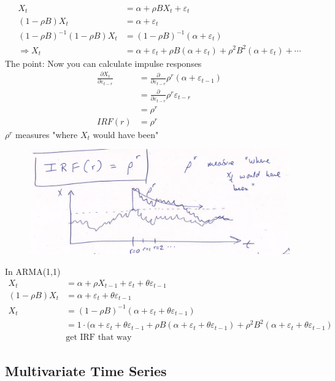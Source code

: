 \begin{align*}
    X_t &= \alpha+ \rho B X_t + \varepsilon_t\\
    (1-\rho B) X_t &= \alpha + \varepsilon_t \\
    (1-\rho B)^{-1}(1-\rho B) X_t &= (1-\rho B)^{-1} (\alpha + \varepsilon_t)\\
    \Rightarrow X_t &= \alpha + \varepsilon_t + \rho B(\alpha + \varepsilon_t)+ \rho^2 B^2(\alpha+\varepsilon_t) + \cdots
\end{align*}
The point: Now you can calculate impulse responses
\begin{align*}
    \frac{\partial X_t}{\partial \varepsilon_{t-r}} &= \frac{\partial}{\partial\varepsilon_{t-r}} \rho^r (\alpha+\varepsilon_{t-1}) \\
    &= \frac{\partial}{\partial \varepsilon_{t-r}} \rho^r \varepsilon_{t-r} \\
    &= \rho^r\\
    IRF(r) &= \rho^r
\end{align*}
$\rho^r$ measures "where $X_t$ would have been"
\begin{figure}[H]
    \centering
    \includegraphics[width=0.75\linewidth]{images/Screenshot 2024-05-21 at 18.16.58.jpg}
\end{figure}

In ARMA(1,1)
\begin{align*}
    X_t &= \alpha + \rho X_{t-1} + \varepsilon_t + \theta \varepsilon_{t-1} \\
    (1-\rho B)X_t &= \alpha + \varepsilon_t + \theta \varepsilon_{t-1} \\
    X_t &= (1-\rho B)^{-1} (\alpha + \varepsilon_t + \theta \varepsilon_{t-1}) \\
&= 1\cdot (\alpha + \varepsilon_t + \theta \varepsilon_{t-1} + \rho B (\alpha + \varepsilon_t + \theta \varepsilon_{t-1}) + \rho^2 B^2(\alpha + \varepsilon_t + \theta\varepsilon_{t-1})\\
&\text{get IRF that way}
\end{align*}

\subsection{Multivariate Time Series}

